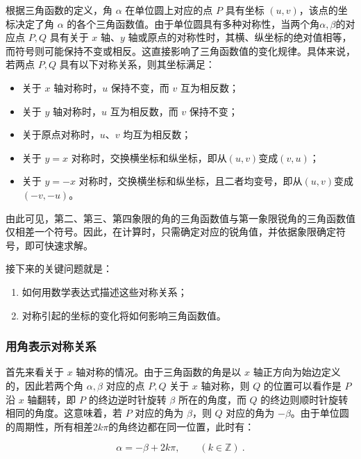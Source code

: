 根据三角函数的定义，角 $\alpha$ 在单位圆上对应的点 $P$ 具有坐标 $(u,v)$，该点的坐标决定了角 $\alpha$ 的各个三角函数值。由于单位圆具有多种对称性，当两个角$\alpha,\beta$的对应点 $P, Q$ 具有关于 $x$ 轴、$y$ 轴或原点的对称性时，其横、纵坐标的绝对值相等，而符号则可能保持不变或相反。这直接影响了三角函数值的变化规律。具体来说，若两点 $P, Q$ 具有以下对称关系，则其坐标满足：
\begin{itemize}
\item 关于 $x$ 轴对称时，$u$ 保持不变，而 $v$ 互为相反数；
\item 关于 $y$ 轴对称时，$u$ 互为相反数，而 $v$ 保持不变；
\item 关于原点对称时，$u$、$v$ 均互为相反数；
\item 关于 $y = x$ 对称时，交换横坐标和纵坐标，即从$(u,v)$变成$(v,u)$；
\item 关于 $y = -x$ 对称时，交换横坐标和纵坐标，且二者均变号，即从$(u,v)$变成$(-v,-u)$。
\end{itemize}

由此可见，第二、第三、第四象限的角的三角函数值与第一象限锐角的三角函数值仅相差一个符号。因此，在计算时，只需确定对应的锐角值，并依据象限确定符号，即可快速求解。

接下来的关键问题就是：
\begin{enumerate}
\item 如何用数学表达式描述这些对称关系；
\item 对称引起的坐标的变化将如何影响三角函数值。
\end{enumerate}

\subsubsection{用角表示对称关系}

首先来看关于 $x$ 轴对称的情况。由于三角函数的角是以 $x$ 轴正方向为始边定义的，因此若两个角 $\alpha, \beta$ 对应的点 $P, Q$ 关于 $x$ 轴对称，则 $Q$ 的位置可以看作是 $P$ 沿 $x$ 轴翻转，即 $P$ 的终边逆时针旋转 $\beta$ 所在的角度，而 $Q$ 的终边则顺时针旋转相同的角度。这意味着，若 $P$ 对应的角为 $\beta$，则 $Q$ 对应的角为 $-\beta$。由于单位圆的周期性，所有相差$2k\pi$的角终边都在同一位置，此时有：

\begin{equation}\label{eq_HsTrFu_5}
\alpha = -\beta + 2k\pi, \qquad (k\in\mathbb{Z})~.
\end{equation}

